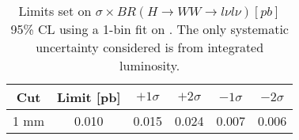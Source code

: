 \begin{table}[!h]
\begin{center}
\begin{tabular}{cc|cccc}
Cut & Limit [pb] & $+1\sigma$ & $+2\sigma$ & $-1\sigma$ & $-2\sigma$ \\
\hline
1 mm & 0.010 & 0.015 & 0.024 & 0.007 & 0.006 \\
\end{tabular}
\end{center}
\caption{Limits set on $\sigma\times BR (H\rightarrow WW\rightarrow l\nu l\nu) [pb]$ \@ 95\% CL 
using a 1-bin fit on \mt. The only systematic uncertainty considered is from integrated luminosity.}
\label{table:limits}
\end{table}
